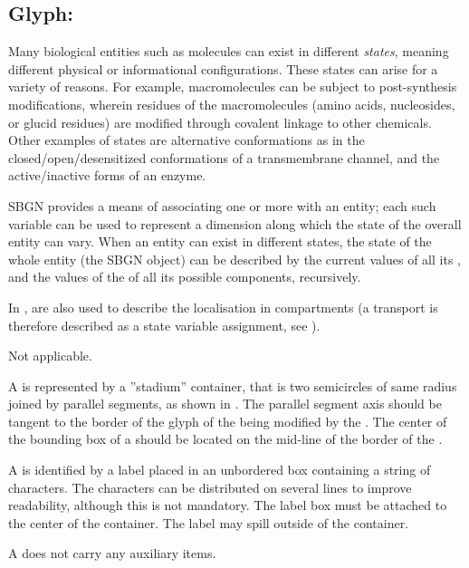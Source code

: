 
\subsection{Glyph: }
\label{sec:stateVariable}

Many biological entities such as molecules can exist in different \emph{states}, meaning different physical or informational configurations.  These states can arise for a variety of reasons.  For example, macromolecules can be subject to post-synthesis modifications, wherein residues of the macromolecules (amino acids, nucleosides, or glucid residues) are modified through covalent linkage to other chemicals.  Other examples of states are alternative conformations as in the closed/open/desensitized conformations of a transmembrane channel, and the active/inactive forms of an enzyme.

SBGN provides a means of associating one or more  with an entity; each such variable can be used to represent a dimension along which the state of the overall entity can vary.  When an entity can exist in different states, the state of the whole entity (\ie the SBGN object) can be described by the current values of all its , and the values of the  of all its possible components, recursively.

In \SBGNERLone,  are also used to describe the localisation in compartments (a transport is therefore described as a state variable assignment, see ).

\begin{glyphDescription}

\glyphSboTerm Not applicable.

\glyphContainer A  is represented by a ''stadium'' container, that is two semicircles of same radius joined by parallel segments, as shown in .  The parallel segment axis should be tangent to the border of the glyph of the  being modified by the . The center of the bounding box of a  should be located on the mid-line of the border of the .

\glyphLabel A  is identified by a label placed in an unbordered box containing a string of characters.  The characters can be distributed on several lines to improve readability, although this is not mandatory.  The label box must be attached to the center of the container.  The label may spill outside of the container.

\glyphAux A  does not carry any auxiliary items.  

\end{glyphDescription}

